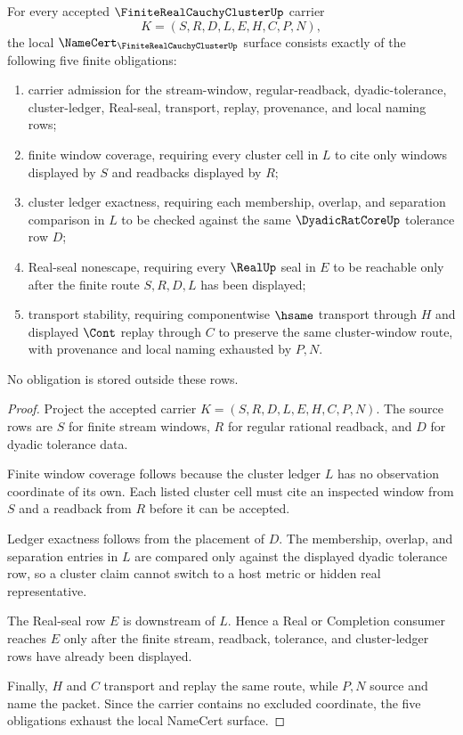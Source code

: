 \begin{theorem}
\label{thm:finite-real-cauchy-cluster-obligations}
For every accepted $\FiniteRealCauchyClusterUp$ carrier
$$
K=(S,R,D,L,E,H,C,P,N),
$$
the local $\NameCert_{\FiniteRealCauchyClusterUp}$ surface consists exactly of the following five finite obligations:
\begin{enumerate}
\item carrier admission for the stream-window, regular-readback, dyadic-tolerance, cluster-ledger, Real-seal, transport, replay, provenance, and local naming rows;
\item finite window coverage, requiring every cluster cell in $L$ to cite only windows displayed by $S$ and readbacks displayed by $R$;
\item cluster ledger exactness, requiring each membership, overlap, and separation comparison in $L$ to be checked against the same $\DyadicRatCoreUp$ tolerance row $D$;
\item Real-seal nonescape, requiring every $\RealUp$ seal in $E$ to be reachable only after the finite route $S,R,D,L$ has been displayed;
\item transport stability, requiring componentwise $\hsame$ transport through $H$ and displayed $\Cont$ replay through $C$ to preserve the same cluster-window route, with provenance and local naming exhausted by $P,N$.
\end{enumerate}
No obligation is stored outside these rows.
\end{theorem}
\begin{proof}
Project the accepted carrier $K=(S,R,D,L,E,H,C,P,N)$. The source rows are $S$ for finite stream windows, $R$ for regular rational readback, and $D$ for dyadic tolerance data.

Finite window coverage follows because the cluster ledger $L$ has no observation coordinate of its own. Each listed cluster cell must cite an inspected window from $S$ and a readback from $R$ before it can be accepted.

Ledger exactness follows from the placement of $D$. The membership, overlap, and separation entries in $L$ are compared only against the displayed dyadic tolerance row, so a cluster claim cannot switch to a host metric or hidden real representative.

The Real-seal row $E$ is downstream of $L$. Hence a Real or Completion consumer reaches $E$ only after the finite stream, readback, tolerance, and cluster-ledger rows have already been displayed.

Finally, $H$ and $C$ transport and replay the same route, while $P,N$ source and name the packet. Since the carrier contains no excluded coordinate, the five obligations exhaust the local NameCert surface.
\end{proof}

